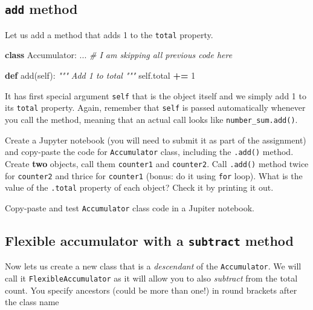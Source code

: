 \documentclass[
]{book}
\newenvironment{Shaded}{\begin{snugshade}}{\end{snugshade}}
\newcommand{\CommentTok}[1]{\textcolor[rgb]{0.56,0.35,0.01}{\textit{#1}}}
\newcommand{\DecValTok}[1]{\textcolor[rgb]{0.00,0.00,0.81}{#1}}
\newcommand{\KeywordTok}[1]{\textcolor[rgb]{0.13,0.29,0.53}{\textbf{#1}}}
\newcommand{\NormalTok}[1]{#1}
\newcommand{\OperatorTok}[1]{\textcolor[rgb]{0.81,0.36,0.00}{\textbf{#1}}}
\newcommand{\VariableTok}[1]{\textcolor[rgb]{0.00,0.00,0.00}{#1}}
\begin{document}
\hypertarget{add-method}{%
\subsection{\texorpdfstring{\texttt{add} method}{add method}}\label{add-method}}

Let us add a method that adds 1 to the \texttt{total} property.

\begin{Shaded}
\begin{Highlighting}[]
\KeywordTok{class}\NormalTok{ Accumulator:}
\NormalTok{    ... }\CommentTok{\# I am skipping all previous code here}
    
    \KeywordTok{def}\NormalTok{ add(}\VariableTok{self}\NormalTok{):}
        \CommentTok{"""}
\CommentTok{        Add 1 to total}
\CommentTok{        """}
        \VariableTok{self}\NormalTok{.total }\OperatorTok{+=} \DecValTok{1}
\end{Highlighting}
\end{Shaded}

It has first special argument \texttt{self} that is the object itself and we simply add 1 to its \texttt{total} property. Again, remember that \texttt{self} is passed automatically whenever you call the method, meaning that an actual call looks like \texttt{number\_sum.add()}.

Create a Jupyter notebook (you will need to submit it as part of the assignment) and copy-paste the code for \texttt{Accumulator} class, including the \texttt{.add()} method. Create \textbf{two} objects, call them \texttt{counter1} and \texttt{counter2}. Call \texttt{.add()} method twice for \texttt{counter2} and thrice for \texttt{counter1} (bonus: do it using \texttt{for} loop). What is the value of the \texttt{.total} property of each object? Check it by printing it out.

Copy-paste and test \texttt{Accumulator} class code in a Jupiter notebook.

\hypertarget{flexible-accumulator-with-a-subtract-method}{%
\subsection{\texorpdfstring{Flexible accumulator with a \texttt{subtract} method}{Flexible accumulator with a subtract method}}\label{flexible-accumulator-with-a-subtract-method}}

Now lets us create a new class that is a \emph{descendant} of the \texttt{Accumulator}. We will call it \texttt{FlexibleAccumulator} as it will allow you to also \emph{subtract} from the total count. You specify ancestors (could be more than one!) in round brackets after the class name
\end{document}
